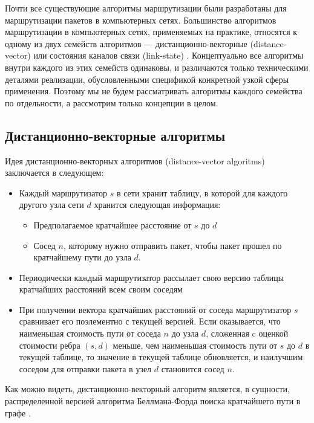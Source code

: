 \documentclass[specification,annotation,times]{itmo-student-thesis}
\theoremstyle{definition}
\begin{document}
Почти все существующие алгоритмы маршрутизации были разработаны для
маршрутизации пакетов в компьютерных сетях. Большинство алгоритмов маршрутизации
в компьютерных сетях, применяемых на практике, относятся к одному из двух
семейств алгоритмов --- дистанционно-векторные (distance-vector) \cite{arpanet-orig} или
состояния каналов связи (link-state) \cite{link-state-arpanet}.
Концептуально все алгоритмы внутри каждого из этих семейств одинаковы, и различаются только
техническими деталями реализации, обусловленными спецификой конкретной узкой
сферы применения. Поэтому мы не будем рассматривать алгоритмы каждого семейства
по отдельности, а рассмотрим только концепции в целом.

\subsection{Дистанционно-векторные алгоритмы}

Идея дистанционно-векторных алгоритмов (distance-vector algoritms) заключается в
следующем:

\begin{itemize}
\item Каждый маршрутизатор $s$ в сети хранит таблицу, в которой для каждого другого узла
  сети $d$ хранится следующая информация:
  \begin{itemize}
  \item Предполагаемое кратчайшее расстояние от $s$ до $d$
  \item Сосед $n$, которому нужно отправить пакет, чтобы пакет прошел по
    кратчайшему пути до узла $d$.
  \end{itemize}
\item Периодически каждый маршрутизатор рассылает свою версию таблицы кратчайших
  расстояний всем своим соседям
\item При получении вектора кратчайших расстояний от соседа маршрутизатор $s$
  сравнивает его поэлементно с текущей версией. Если оказывается, что наименьшая
  стоимость пути от соседа $n$ до узла $d$, сложенная c оценкой стоимости ребра
  $(s, d)$ меньше, чем наименьшая стоимость пути от $s$ до $d$ в текущей
  таблице, то значение в текущей таблице обновляется, и наилучшим соседом для
  отправки пакета в узел $d$ становится сосед $n$.
\end{itemize}

Как можно видеть, дистанционно-векторный алгоритм является, в сущности,
распределенной версией алгоритма Беллмана-Форда поиска кратчайшего пути в
графе \cite{bellman-ford}.
\end{document}
